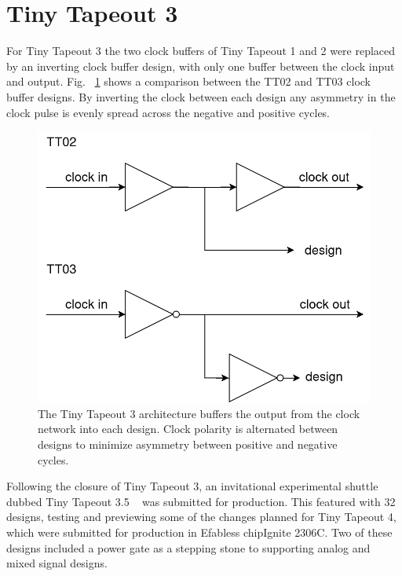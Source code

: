 \section{Tiny Tapeout 3}
\label{sec:tinytapeout3}

For Tiny Tapeout 3 the two clock buffers of Tiny Tapeout 1 and 2 were replaced by an inverting clock buffer design, with only one buffer between the clock input and output. Fig. ~\ref{fig:TT02_vs_TT03} shows a comparison between the TT02 and TT03 clock buffer designs. By inverting the clock between each design any asymmetry in the clock pulse is evenly spread across the negative and positive cycles.

\begin{figure}[!t]
\centering
\includegraphics[width=\columnwidth]{./Figs/tt02 vs tt03 scanchain clock.png}
\caption{The Tiny Tapeout 3 architecture buffers the output from the clock network into each design. Clock polarity is alternated between designs to minimize asymmetry between positive and negative cycles.}
\label{fig:TT02_vs_TT03}
\end{figure}

Following the closure of Tiny Tapeout 3, an invitational experimental shuttle dubbed Tiny Tapeout 3.5 ~\cite{tinytapeout03p5} was submitted for production. This featured with 32 designs, testing and previewing some of the changes planned for Tiny Tapeout 4, which were submitted for production in Efabless chipIgnite 2306C.
Two of these designs included a power gate as a stepping stone to supporting analog and mixed signal designs.

